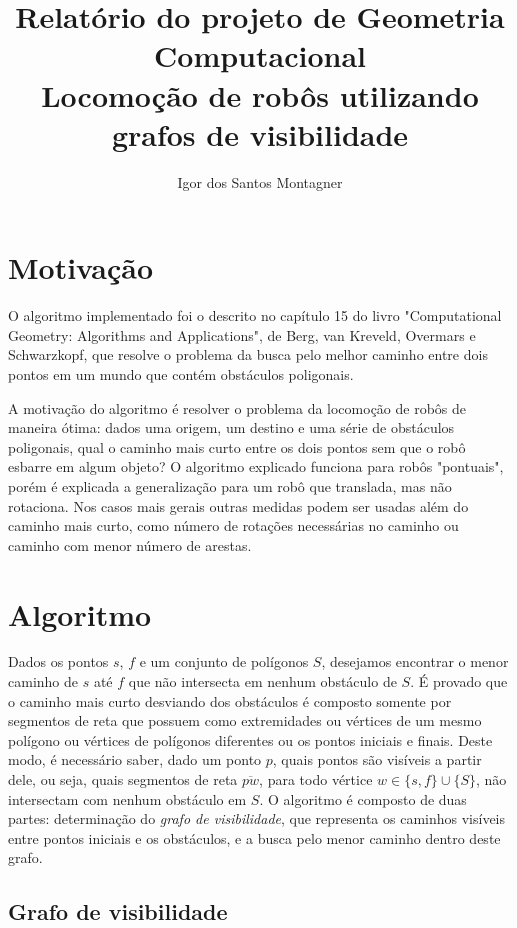 \documentclass[11pt]{article} %
\title{Relatório do projeto de Geometria Computacional\\Locomoção de robôs utilizando grafos de visibilidade}
\author{Igor dos Santos Montagner}
\begin{document}
\maketitle

\section{Motivação}
O algoritmo implementado foi o descrito no capítulo 15 do livro "Computational Geometry: Algorithms and Applications", de Berg, van Kreveld, Overmars e Schwarzkopf, que resolve o problema da busca pelo melhor caminho entre dois pontos em um mundo que contém obstáculos poligonais.

A motivação do algoritmo é resolver o problema da locomoção de robôs de maneira ótima: dados uma origem, um destino e uma série de obstáculos poligonais, qual o caminho mais curto entre os dois pontos sem que o robô esbarre em algum objeto? O algoritmo explicado funciona para robôs "pontuais", porém é explicada a generalização para um robô que translada, mas não rotaciona. Nos casos mais gerais outras medidas podem ser usadas além do caminho mais curto, como número de rotações necessárias no caminho ou caminho com menor número de arestas.

\section{Algoritmo}

Dados os pontos $s$, $f$ e um conjunto de polígonos $S$, desejamos encontrar o menor caminho de $s$ até $f$ que não intersecta em nenhum obstáculo de $S$. É provado que o caminho mais curto desviando dos obstáculos é composto somente por segmentos de reta que possuem como extremidades ou vértices de um mesmo polígono ou vértices de polígonos diferentes ou os pontos iniciais e finais. Deste modo, é necessário saber, dado um ponto $p$, quais pontos são visíveis a partir dele, ou seja, quais segmentos de reta $\overline{pw}$, para todo vértice $w \in \{s, f\} \cup \{S\}$, não intersectam com nenhum obstáculo em $S$. O algoritmo é composto de duas partes: determinação do \emph{grafo de visibilidade}, que representa os caminhos visíveis entre pontos iniciais e os obstáculos, e a busca pelo menor caminho dentro deste grafo.

\subsection{Grafo de visibilidade}
\end{document}
